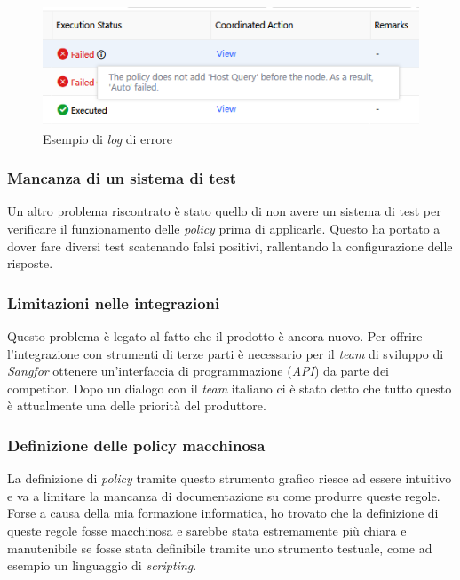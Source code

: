 \begin{figure}[!htbp]
    \centering
    \includegraphics[width=0.9\linewidth]{images/ndr/failed-response.png}
    \caption{Esempio di \emph{log} di errore}
    \label{fig:failed-response}
\end{figure}

\subsubsection{Mancanza di un sistema di test}

Un altro problema riscontrato è stato quello di non avere un sistema di test per verificare il funzionamento delle \emph{policy} prima di applicarle. Questo ha portato a dover fare diversi test scatenando falsi positivi, rallentando la configurazione delle risposte.

\subsubsection{Limitazioni nelle integrazioni}

Questo problema è legato al fatto che il prodotto è ancora nuovo. Per offrire l'integrazione con strumenti di terze parti è necessario per il \emph{team} di sviluppo di \emph{Sangfor} ottenere un'interfaccia di programmazione (\emph{API}) da parte dei competitor. Dopo un dialogo con il \emph{team} italiano ci è stato detto che tutto questo è attualmente una delle priorità del produttore.

\subsubsection{Definizione delle policy macchinosa}
\label{sez:policy-macchinosa}

La definizione di \emph{policy} tramite questo strumento grafico riesce ad essere intuitivo e va a limitare la mancanza di documentazione su come produrre queste regole. Forse a causa della mia formazione informatica, ho trovato che la definizione di queste regole fosse macchinosa e sarebbe stata estremamente più chiara e manutenibile se fosse stata definibile tramite uno strumento testuale, come ad esempio un linguaggio di \emph{scripting}.

